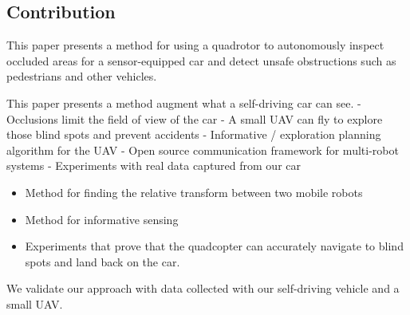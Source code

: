 \subsection{Contribution}

This paper presents a method for using a quadrotor to autonomously inspect
occluded areas for a sensor-equipped car and detect unsafe obstructions such as
pedestrians and other vehicles.

This paper presents a method augment what a self-driving car can see.
- Occlusions limit the field of view of the car
- A small UAV can fly to explore those blind spots and prevent accidents
- Informative / exploration planning algorithm for the UAV
- Open source communication framework for multi-robot systems
- Experiments with real data captured from our car 

\begin{itemize}
\item
Method for finding the relative transform between two mobile robots
\item
Method for informative sensing
\item
Experiments that prove that the quadcopter can accurately navigate
to blind spots and land back on the car.
\end{itemize}

We validate our approach with data collected with our self-driving vehicle and a small UAV.

